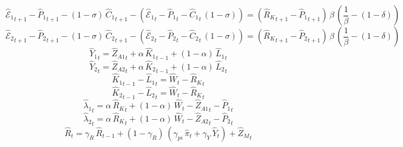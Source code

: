 \begin{dmath}
{{\hat{\mathscr{E}}_{1}}}_{t+1}-{{\hat{P}_{1}}}_{t+1}-\left(1-{{\sigma}}\right)\, {{\hat{C}_{1}}}_{t+1}-\left({{\hat{\mathscr{E}}_{1}}}_{t}-{{\hat{P}_{1}}}_{t}-{{\hat{C}_{1}}}_{t}\, \left(1-{{\sigma}}\right)\right)=\left({{\hat{R}_{K}}}_{t+1}-{{\hat{P}_{1}}}_{t+1}\right)\, {{\beta}}\, \left(\frac{1}{{{\beta}}}-\left(1-{{\delta}}\right)\right)
\end{dmath}
\begin{dmath}
{{\hat{\mathscr{E}}_{2}}}_{t+1}-{{\hat{P}_{2}}}_{t+1}-\left(1-{{\sigma}}\right)\, {{\hat{C}_{2}}}_{t+1}-\left({{\hat{\mathscr{E}}_{2}}}_{t}-{{\hat{P}_{2}}}_{t}-{{\hat{C}_{2}}}_{t}\, \left(1-{{\sigma}}\right)\right)=\left({{\hat{R}_{K}}}_{t+1}-{{\hat{P}_{2}}}_{t+1}\right)\, {{\beta}}\, \left(\frac{1}{{{\beta}}}-\left(1-{{\delta}}\right)\right)
\end{dmath}
\begin{dmath}
{{\hat{Y}_{1}}}_{t}={{\hat{Z}_{A1}}}_{t}+{{\alpha}}\, {{\hat{K}_{1}}}_{t-1}+\left(1-{{\alpha}}\right)\, {{\hat{L}_{1}}}_{t}
\end{dmath}
\begin{dmath}
{{\hat{Y}_{2}}}_{t}={{\hat{Z}_{A2}}}_{t}+{{\alpha}}\, {{\hat{K}_{2}}}_{t-1}+\left(1-{{\alpha}}\right)\, {{\hat{L}_{2}}}_{t}
\end{dmath}
\begin{dmath}
{{\hat{K}_{1}}}_{t-1}-{{\hat{L}_{1}}}_{t}={{\hat{W}}}_{t}-{{\hat{R}_{K}}}_{t}
\end{dmath}
\begin{dmath}
{{\hat{K}_{2}}}_{t-1}-{{\hat{L}_{2}}}_{t}={{\hat{W}}}_{t}-{{\hat{R}_{K}}}_{t}
\end{dmath}
\begin{dmath}
{{\hat{\lambda}_{1}}}_{t}={{\alpha}}\, {{\hat{R}_{K}}}_{t}+\left(1-{{\alpha}}\right)\, {{\hat{W}}}_{t}-{{\hat{Z}_{A1}}}_{t}-{{\hat{P}_{1}}}_{t}
\end{dmath}
\begin{dmath}
{{\hat{\lambda}_{2}}}_{t}={{\alpha}}\, {{\hat{R}_{K}}}_{t}+\left(1-{{\alpha}}\right)\, {{\hat{W}}}_{t}-{{\hat{Z}_{A2}}}_{t}-{{\hat{P}_{2}}}_{t}
\end{dmath}
\begin{dmath}
{{\hat{R}}}_{t}={{\gamma_{R}}}\, {{\hat{R}}}_{t-1}+\left(1-{{\gamma_{R}}}\right)\, \left({{\gamma_{pi}}}\, {{\hat{\pi}}}_{t}+{{\gamma_{Y}}}\, {{\hat{Y}}}_{t}\right)+{{\hat{Z}_M}}_{t}
\end{dmath}
